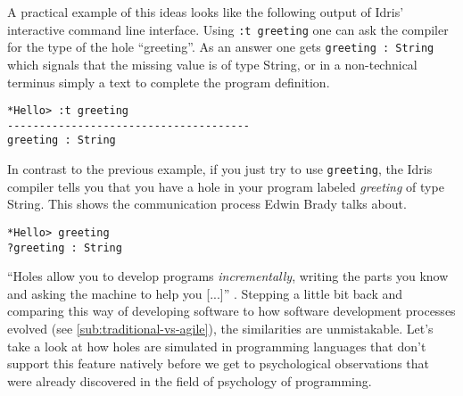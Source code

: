 A practical example of this ideas looks like the following output of Idris' interactive command line interface.
Using \verb|:t greeting| one can ask the compiler for the type of the hole ``greeting''.
As an answer one gets \verb|greeting : String| which signals that the missing value is of type String, or in a non-technical terminus simply a text to complete the program definition.

\begin{verbatim}
*Hello> :t greeting
--------------------------------------
greeting : String
\end{verbatim}

In contrast to the previous example, if you just try to use \verb|greeting|, the Idris compiler tells you that you have a hole in your program labeled \emph{greeting} of type String.
This shows the communication process Edwin Brady talks about.

\begin{verbatim}
*Hello> greeting
?greeting : String
\end{verbatim}

``Holes allow you to develop programs \emph{incrementally}, writing the parts you know and asking the machine to help you [...]'' \autocite[21]{brady_type-driven_2017}.
Stepping a little bit back and comparing this way of developing software to how software development processes evolved (see \cref{sub:traditional-vs-agile}), the similarities are unmistakable.
Let's take a look at how holes are simulated in programming languages that don't support this feature natively before we get to psychological observations that were already discovered in the field of psychology of programming.

